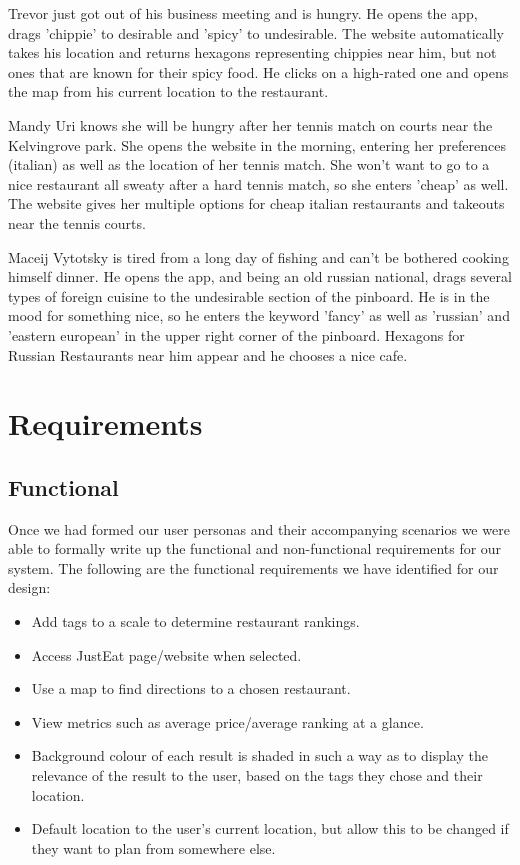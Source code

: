 \documentclass[10pt,a4paper]{article}
\begin{document}
\begin{framed}
Trevor just got out of his business meeting and is hungry. He opens the app, drags 'chippie' to desirable and 'spicy' to undesirable. The website automatically takes his location and returns hexagons representing chippies near him, but not ones that are known for their spicy food. He clicks on a high-rated one and opens the map from his current location to the restaurant.

Mandy Uri knows she will be hungry after her tennis match on courts near the Kelvingrove park. She opens the website in the morning, entering her preferences (italian) as well as the location of her tennis match. She won't want to go to a nice restaurant all sweaty after a hard tennis match, so she enters 'cheap' as well. The website gives her multiple options for cheap italian restaurants and takeouts near the tennis courts.

Maceij Vytotsky is tired from a long day of fishing and can't be bothered cooking himself dinner. He opens the app, and being an old russian national, drags several types of foreign cuisine to the undesirable section of the pinboard. He is in the mood for something nice, so he enters the keyword 'fancy' as well as 'russian' and 'eastern european' in the upper right corner of the pinboard. Hexagons for Russian Restaurants near him appear and he chooses a nice cafe.
\end{framed}

\section*{Requirements}
\subsection*{Functional}
Once we had formed our user personas and their accompanying scenarios we were able to formally write up the functional and non-functional requirements for our system. The following are the functional requirements we have identified for our design:

\begin{itemize}
	\item Add tags to a scale to determine restaurant rankings.
	\item Access JustEat page/website when selected.
	\item Use a map to find directions to a chosen restaurant.
	\item View metrics such as average price/average ranking at a glance.
	\item Background colour of each result is shaded in such a way as to display the relevance of the result to the user, based on the tags they chose and their location.
	\item Default location to the user's current location, but allow this to be changed if they want to plan from somewhere else.
\end{itemize}
	
\end{document}
